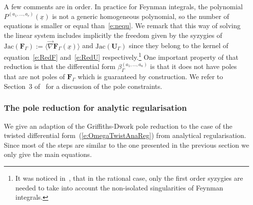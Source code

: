 \documentclass[a4paper,12pt]{article}
\numberwithin{equation}{section}
\numberwithin{figure}{section}
\begin{document}
A few comments are in order. In practice for Feynman integrals,   the polynomial $ P^{(a_1,\dots,a_r)}(\underline x)$ is not a generic
homogeneous polynomial, so the number of equations is smaller or equal than~\eqref{e:nequ}.
%
We remark that this way of solving the linear system includes implicitly the
freedom given by the syzygies of $\textrm{Jac}(\textbf{F}_\Gamma)
 :=\langle \vec\nabla \textbf{F}_\Gamma(\underline x)\rangle$ and
$\textrm{Jac}(\textbf{U}_\Gamma)$ since they belong to
the kernel of equation~\eqref{e:RedF} and~\eqref{e:RedU}
respectively.\footnote{It was noticed in~\cite{Lairez:2022zkj},  that in
  the rational case, only the first order syzygies are needed to take
  into account the non-isolated singularities of Feynman integrals.}
%
%
%
One important property of that reduction is that the differential form $\beta_\Gamma^{(a_1,\dots,a_n)}$ is that it
does not have poles that are not poles of $\textbf{F}_\Gamma$ which is
guaranteed by  construction. We refer
to Section~3 of~\cite{Lairez:2022zkj} for a discussion of the pole constraints.
%
%
  \subsubsection{The pole reduction for analytic
    regularisation}\label{sec:PoleRedAn}
We give an adaption of the Griffiths-Dwork pole reduction to the case
of the twisted differential form~(\ref{e:OmegaTwistAnaReg})  from
analytical regularisation. Since most of the steps are similar to the
one presented in the previous section we only give the main equations.
\end{document}
